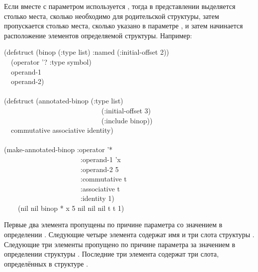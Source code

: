 Если вместе с параметром  используется , тогда в
представлении выделяется столько места, сколько необходимо для родительской
структуры, затем пропускается столько места, сколько указано в параметре
, и затем начинается расположение элементов определяемой
структуры.  Например:
\begin{lisp}
(defstruct (binop (:type list) :named (:initial-offset 2)) \\
~~(operator '? :type symbol) \\
~~operand-1 \\
~~operand-2) \\
 \\
(defstruct (annotated-binop (:type list) \\
~~~~~~~~~~~~~~~~~~~~~~~~~~~~(:initial-offset 3) \\
~~~~~~~~~~~~~~~~~~~~~~~~~~~~(:include binop)) \\
~~commutative associative identity) \\
 \\
(make-annotated-binop :operator '* \\
~~~~~~~~~~~~~~~~~~~~~~:operand-1 'x \\
~~~~~~~~~~~~~~~~~~~~~~:operand-2 5 \\
~~~~~~~~~~~~~~~~~~~~~~:commutative t \\
~~~~~~~~~~~~~~~~~~~~~~:associative t \\
~~~~~~~~~~~~~~~~~~~~~~:identity 1) \\
~~~\EV\ (nil nil binop * x 5 nil nil nil t t 1)
\end{lisp}
Первые два {\nil} элемента пропущены по причине параметра 
со значением  в определении . Следующие четыре элемента
содержат имя и три слота структуры . Следующие три {\nil} элементы
пропущено по причине параметра  за значением  в
определении структуры . Последние три элемента содержат три
слота, определённых в структуре .
\fi